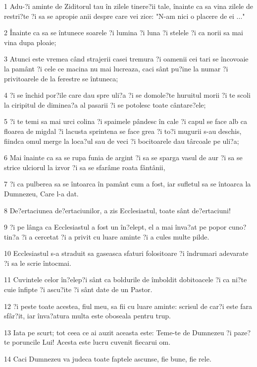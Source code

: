 \par 1 Adu-?i aminte de Ziditorul tau în zilele tinere?ii tale, înainte ca sa vina zilele de restri?te ?i sa se apropie anii despre care vei zice: "N-am nici o placere de ei ..."
\par 2 Înainte ca sa se întunece soarele ?i lumina ?i luna ?i stelele ?i ca norii sa mai vina dupa ploaie;
\par 3 Atunci este vremea când strajerii casei tremura ?i oamenii cei tari se încovoaie la pamânt ?i cele ce macina nu mai lucreaza, caci sânt pu?ine la numar ?i privitoarele de la ferestre se întuneca;
\par 4 ?i se închid por?ile care dau spre uli?a ?i se domole?te huruitul morii ?i te scoli la ciripitul de diminea?a al pasarii ?i se potolesc toate cântare?ele;
\par 5 ?i te temi sa mai urci colina ?i spaimele pândesc în cale ?i capul se face alb ca floarea de migdal ?i lacusta sprintena se face grea ?i to?i mugurii s-au deschis, fiindca omul merge la loca?ul sau de veci ?i bocitoarele dau târcoale pe uli?a;
\par 6 Mai înainte ca sa se rupa funia de argint ?i sa se sparga vasul de aur ?i sa se strice ulciorul la izvor ?i sa se sfarâme roata fântânii,
\par 7 ?i ca pulberea sa se întoarca în pamânt cum a fost, iar sufletul sa se întoarca la Dumnezeu, Care l-a dat.
\par 8 De?ertaciunea de?ertaciunilor, a zis Ecclesiastul, toate sânt de?ertaciuni!
\par 9 ?i pe lânga ca Ecclesiastul a fost un în?elept, el a mai înva?at pe popor cuno?tin?a ?i a cercetat ?i a privit cu luare aminte ?i a cules multe pilde.
\par 10 Ecclesiastul s-a straduit sa gaseasca sfaturi folositoare ?i îndrumari adevarate ?i sa le scrie întocmai.
\par 11 Cuvintele celor în?elep?i sânt ca boldurile de îmboldit dobitoacele ?i ca ni?te cuie înfipte ?i ascu?ite ?i sânt date de un Pastor.
\par 12 ?i peste toate acestea, fiul meu, sa fii cu luare aminte: scrisul de car?i este fara sfâr?it, iar înva?atura multa este oboseala pentru trup.
\par 13 Iata pe scurt; tot ceea ce ai auzit aceasta este: Teme-te de Dumnezeu ?i paze?te poruncile Lui! Acesta este lucru cuvenit fiecarui om.
\par 14 Caci Dumnezeu va judeca toate faptele ascunse, fie bune, fie rele.


